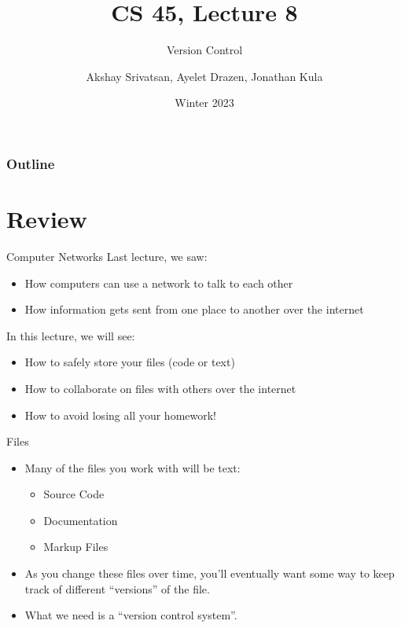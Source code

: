 \usepackage{shared/cs45}
\usepackage{tikz}
\usetikzlibrary{graphs}
\tikzset{>=latex}

\title{CS 45, Lecture 8}
\subtitle{Version Control}
\date{Winter 2023}
\author{Akshay Srivatsan, Ayelet Drazen, Jonathan Kula}

\newcommand{\var}[1]{\texttt{\$#1}}
\newcommand{\cmd}[1]{\texttt{#1}}



\maketitle

\frame{\titlepage}

\begin{frame}
  \frametitle{Outline}
  \tableofcontents[hidesubsections]
\end{frame}

\section{Review}

\begin{frame}{Computer Networks}
  Last lecture, we saw:
  \begin{itemize}
    \item How computers can use a network to talk to each other
    \item How information gets sent from one place to another over the internet
  \end{itemize}
  \pause

  In this lecture, we will see:
  \begin{itemize}
    \item How to safely store your files (code or text)
    \item How to collaborate on files with others over the internet
    \item \alert{How to avoid losing all your homework!}
  \end{itemize}
\end{frame}

\begin{frame}{Files}
  \begin{itemize}
    \item Many of the files you work with will be text:
      \pause
      \begin{itemize}
        \item Source Code
        \item Documentation
        \item Markup Files
      \end{itemize}
    \pause
    \item As you change these files over time, you'll eventually want some way
      to keep track of different \enquote{versions} of the file.
    \pause
    \item What we need is a \enquote{version control system}.
  \end{itemize}
\end{frame}

